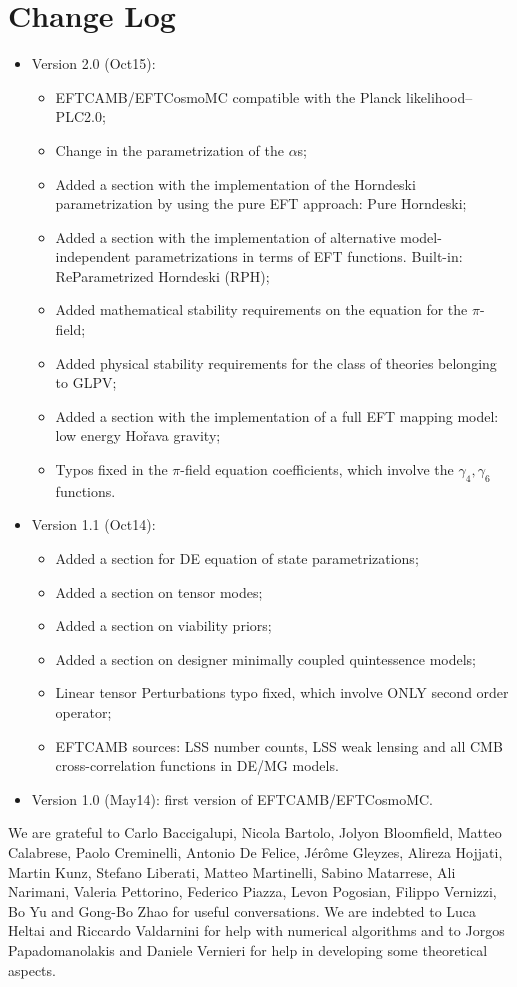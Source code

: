 \documentclass[prd,nofootinbib,showpacs]{revtex4}
\begin{document}
{%
\section*{Change Log}\label{Sec:ChangeLog}
%
\begin{itemize}
\item Version 2.0 (Oct15):
\begin{itemize}
\item EFTCAMB/EFTCosmoMC compatible with the Planck likelihood--PLC2.0;
\item Change in the parametrization of the $\alpha$s;
\item Added a section with the implementation of the Horndeski parametrization by using the pure EFT approach: Pure Horndeski;
\item Added a section with the implementation of alternative model-independent parametrizations in terms of EFT functions. Built-in: ReParametrized Horndeski (RPH);
\item Added mathematical stability requirements on the equation for the $\pi$-field; 
\item Added physical stability requirements  for the class of theories belonging to GLPV;
\item Added a section with the implementation of a full EFT mapping model: low energy Ho\v rava gravity;
\item Typos fixed in the $\pi$-field equation coefficients, which involve the $\gamma_4, \gamma_6$ functions.
\end{itemize}
\item Version 1.1 (Oct14):
\begin{itemize}
\item Added a section for DE equation of state parametrizations;
\item Added a section on tensor modes;
\item Added a section on viability priors;
\item Added a section on designer minimally coupled quintessence models;
\item Linear tensor Perturbations typo fixed, which involve ONLY second order operator;
\item EFTCAMB sources: LSS number counts, LSS weak lensing and all CMB cross-correlation functions in DE/MG models.
\end{itemize}
\item Version 1.0 (May14): first version of EFTCAMB/EFTCosmoMC.
\end{itemize}
%
\acknowledgments
%
We are grateful to Carlo Baccigalupi, Nicola Bartolo, Jolyon Bloomfield, Matteo Calabrese, Paolo Creminelli, Antonio De Felice, J\'er\^{o}me Gleyzes, Alireza Hojjati, Martin Kunz, Stefano Liberati, Matteo Martinelli, Sabino Matarrese, Ali Narimani, Valeria Pettorino, Federico Piazza, Levon Pogosian, Filippo Vernizzi, Bo Yu and Gong-Bo Zhao for useful conversations. We are indebted to Luca Heltai and Riccardo Valdarnini for help with numerical algorithms and to Jorgos Papadomanolakis and Daniele Vernieri for help in developing some theoretical aspects.

}
\end{document}
